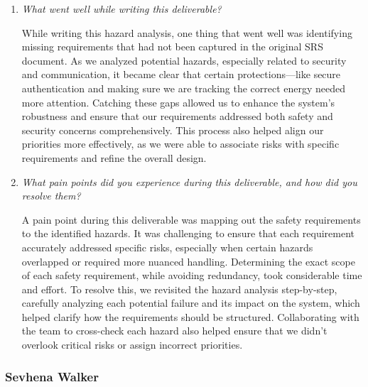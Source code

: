 \documentclass{article}
\newcounter{hazard}
\begin{document}
\begin{enumerate}
  \item \textit{What went well while writing this deliverable?}
  
  While writing this hazard analysis, one thing that went well was identifying missing requirements that had not been captured in the original SRS document. As we analyzed potential hazards, especially related to security and communication, it became clear that certain protections—like secure authentication and making sure we are tracking the correct energy needed more attention. Catching these gaps allowed us to enhance the system's robustness and ensure that our requirements addressed both safety and security concerns comprehensively. This process also helped align our priorities more effectively, as we were able to associate risks with specific requirements and refine the overall design.

  \item \textit{What pain points did you experience during this deliverable, and how did you resolve them?}
  
  A pain point during this deliverable was mapping out the safety requirements to the identified hazards. It was challenging to ensure that each requirement accurately addressed specific risks, especially when certain hazards overlapped or required more nuanced handling. Determining the exact scope of each safety requirement, while avoiding redundancy, took considerable time and effort. To resolve this, we revisited the hazard analysis step-by-step, carefully analyzing each potential failure and its impact on the system, which helped clarify how the requirements should be structured. Collaborating with the team to cross-check each hazard also helped ensure that we didn’t overlook critical risks or assign incorrect priorities.

\end{enumerate}

\subsubsection*{Sevhena Walker}
\end{document}
